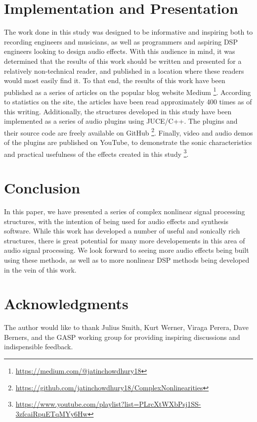 \documentclass[twoside,a4paper]{article}
\begin{document}
\section{Implementation and Presentation} \label{sec:pres}
%
The work done in this study was designed to be informative and inspiring
both to recording engineers and musicians, as well as programmers and
aspiring DSP engineers looking to design audio effects. With this audience
in mind, it was determined that the results of this work should be written
and presented for a relatively non-technical reader, and published in a
location where these readers would most easily find it. To that end, the
results of this work have been published as a series of articles on the
popular blog website Medium \footnote{\url{https://medium.com/@jatinchowdhury18}}.
According to statistics on the site, the articles have been read approximately
400 times as of this writing. Additionally, the structures developed
in this study have been implemented as a series of audio plugins using JUCE/C++.
The plugins and their source code are freely available on GitHub
\footnote{\url{https://github.com/jatinchowdhury18/ComplexNonlinearities}}.
Finally, video and audio demos of the plugins are published on YouTube, to
demonstrate the sonic characteristics and practical usefulness of the
effects created in this study
\footnote{\url{https://www.youtube.com/playlist?list=PLrcXtWXbPsj1SS-3zfcaiRpuETqMYy6Hw}}.

\section{Conclusion} \label{sec:conclusion}
%
In this paper, we have presented a series of complex nonlinear signal
processing structures, with the intention of being used for audio effects
and synthesis software. While this work has developed a number of useful
and sonically rich structures, there is great potential for many more
developements in this area of audio signal processing. We look forward
to seeing more audio effects being built using these methods, as well as to
more nonlinear DSP methods being developed in the vein of this work.

\section{Acknowledgments}
%
The author would like to thank Julius Smith, Kurt Werner, Viraga Perera,
Dave Berners, and the GASP working group for providing inspiring discussions
and indispensible feedback.

\nocite{*}


\end{document}
